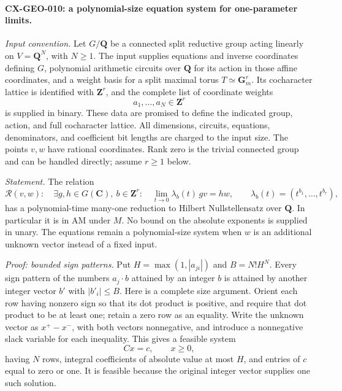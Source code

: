 \paragraph{CX-GEO-010: a polynomial-size equation system for one-parameter limits.}
\emph{Input convention.} Let $G/\mathbf Q$ be a connected split reductive
group acting linearly on $V=\mathbf Q^N$, with $N\ge1$.
The input supplies equations and inverse coordinates defining $G$,
polynomial arithmetic circuits over $\mathbf Q$ for its action in those
affine coordinates, and a weight basis for a
split maximal torus $T\simeq\mathbf G_m^r$. Its cocharacter lattice is
identified with $\mathbf Z^r$, and the complete list of coordinate
weights
\[
                     a_1,\ldots,a_N\in\mathbf Z^r
\]
is supplied in binary. These data are promised to define the indicated
group, action, and full cocharacter lattice. All dimensions, circuits,
equations, denominators, and coefficient bit lengths are charged to the
input size. The points $v,w$ have rational coordinates. Rank zero is the
trivial connected group and can be handled directly; assume $r\ge1$ below.

\emph{Statement.} The relation
\[
 \mathcal R(v,w):\quad
 \exists g,h\in G(\mathbf C),\ b\in\mathbf Z^r:\quad
       \lim_{t\longrightarrow0}\lambda_b(t)\,g v=h w,
 \qquad \lambda_b(t)=(t^{b_1},\ldots,t^{b_r}),
\]
has a polynomial-time many-one reduction to Hilbert Nullstellensatz over
$\mathbf Q$. In particular it is in AM under $M$. No bound on the
absolute exponents is supplied in unary. The equations remain a
polynomial-size system when $w$ is an additional unknown vector instead
of a fixed input.

\emph{Proof: bounded sign patterns.} Put
$H=\max(1,|a_{ji}|)$ and $B=N!H^N$.
Every sign pattern of the numbers $a_j\cdot b$ attained by an integer
$b$ is attained by another integer vector $b'$ with $|b'_i|\le B$.
Here is a complete size argument. Orient each row having nonzero sign
so that its dot product is positive, and require that dot product to be
at least one; retain a zero row as an equality. Write the unknown vector
as $x^+-x^-$, with both vectors nonnegative, and introduce a nonnegative
slack variable for each inequality. This gives a feasible system
\[
                       Cx=c,\qquad x\ge0,
\]
having $N$ rows, integral coefficients of absolute value at most $H$,
and entries of $c$ equal to zero or one. It is feasible because the
original integer vector supplies one such solution.

